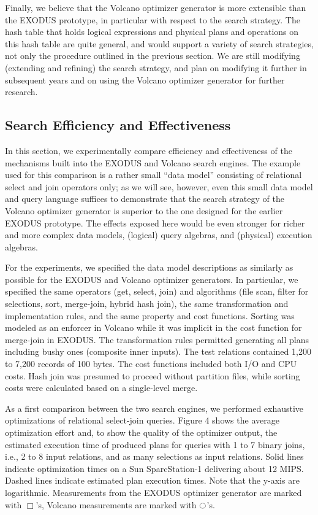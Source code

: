\documentclass[a4paper,12pt,notitlepage,twoside,openright]{article}
\begin{document}
Finally, we believe that the Volcano optimizer generator is more
extensible than the EXODUS prototype, in particular with respect to the
search strategy. The hash table that holds logical expressions and
physical plans and operations on this hash table are quite general, and
would support a variety of search strategies, not only the procedure
outlined in the previous section. We are still modifying (extending and
refining) the search strategy, and plan on modifying it further in
subsequent years and on using the Volcano optimizer generator for
further research.

\hypertarget{search-efficiency-and-effectiveness}{%
\subsection{Search Efficiency and
Effectiveness}\label{search-efficiency-and-effectiveness}}

In this section, we experimentally compare efficiency and effectiveness
of the mechanisms built into the EXODUS and Volcano search engines. The
example used for this comparison is a rather small ``data model''
consisting of relational select and join operators only; as we will see,
however, even this small data model and query language suffices to
demonstrate that the search strategy of the Volcano optimizer generator
is superior to the one designed for the earlier EXODUS prototype. The
effects exposed here would be even stronger for richer and more complex
data models, (logical) query algebras, and (physical) execution
algebras.

For the experiments, we specified the data model descriptions as
similarly as possible for the EXODUS and Volcano optimizer generators.
In particular, we specified the same operators (get, select, join) and
algorithms (file scan, filter for selections, sort, merge-join, hybrid
hash join), the same transformation and implementation rules, and the
same property and cost functions. Sorting was modeled as an enforcer in
Volcano while it was implicit in the cost function for merge-join in
EXODUS. The transformation rules permitted generating all plans
including bushy ones (composite inner inputs). The test relations
contained 1,200 to 7,200 records of 100 bytes. The cost functions
included both I/O and CPU costs. Hash join was presumed to proceed
without partition files, while sorting costs were calculated based on a
single-level merge.

As a first comparison between the two search engines, we performed
exhaustive optimizations of relational select-join queries. Figure 4
shows the average optimization effort and, to show the quality of the
optimizer output, the estimated execution time of produced plans for
queries with 1 to 7 binary joins, i.e., 2 to 8 input relations, and as
many selections as input relations. Solid lines indicate optimization
times on a Sun SparcStation-1 delivering about 12 MIPS. Dashed lines
indicate estimated plan execution times. Note that the y-axis are
logarithmic. Measurements from the EXODUS optimizer generator are marked
with \( \Box \)'s, Volcano measurements are marked with \( \ocircle \)'s.
\end{document}
